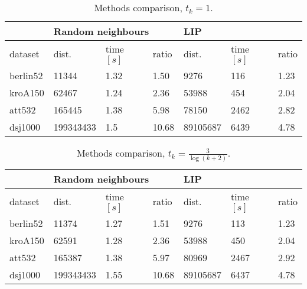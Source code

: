 \begin{table}[!htb]
	\centering
	\begin{tabular}{l|lll|lll|}
		\cline{2-7}
		& \multicolumn{3}{l|}{Random neighbours}                                        & \multicolumn{3}{l|}{LIP}                                          \\ \hline
		\multicolumn{1}{|l|}{dataset}  & \multicolumn{1}{l|}{dist.}     & \multicolumn{1}{l|}{time $[s]$} & ratio & \multicolumn{1}{l|}{dist.}    & \multicolumn{1}{l|}{time $[s]$} & ratio \\ \hline
		\multicolumn{1}{|l|}{berlin52} & \multicolumn{1}{l|}{11344}     & \multicolumn{1}{l|}{1.32} & 1.50  & \multicolumn{1}{l|}{9276}     & \multicolumn{1}{l|}{116}  & 1.23  \\ \hline
		\multicolumn{1}{|l|}{kroA150}  & \multicolumn{1}{l|}{62467}     & \multicolumn{1}{l|}{1.24} & 2.36  & \multicolumn{1}{l|}{53988}    & \multicolumn{1}{l|}{454}  & 2.04  \\ \hline
		\multicolumn{1}{|l|}{att532}   & \multicolumn{1}{l|}{165445}    & \multicolumn{1}{l|}{1.38} & 5.98  & \multicolumn{1}{l|}{78150}    & \multicolumn{1}{l|}{2462} & 2.82  \\ \hline
		\multicolumn{1}{|l|}{dsj1000}  & \multicolumn{1}{l|}{199343433} & \multicolumn{1}{l|}{1.5}  & 10.68 & \multicolumn{1}{l|}{89105687} & \multicolumn{1}{l|}{6439} & 4.78  \\ \hline
	\end{tabular}
	\caption{Methods comparison, $t_k=1$.}
	\label{tab:results_comp_cool=1}
\end{table}

\begin{table}[!htb]
	\centering
	\begin{tabular}{l|lll|lll|}
		\cline{2-7}
		& \multicolumn{3}{l|}{Random neighbours}                                        & \multicolumn{3}{l|}{LIP}                                          \\ \hline
		\multicolumn{1}{|l|}{dataset}  & \multicolumn{1}{l|}{dist.}     & \multicolumn{1}{l|}{time $[s]$} & ratio & \multicolumn{1}{l|}{dist.}    & \multicolumn{1}{l|}{time $[s]$} & ratio \\ \hline
		\multicolumn{1}{|l|}{berlin52} & \multicolumn{1}{l|}{11374}     & \multicolumn{1}{l|}{1.27} & 1.51  & \multicolumn{1}{l|}{9276}     & \multicolumn{1}{l|}{113}  & 1.23  \\ \hline
		\multicolumn{1}{|l|}{kroA150}  & \multicolumn{1}{l|}{62591}     & \multicolumn{1}{l|}{1.28} & 2.36  & \multicolumn{1}{l|}{53988}    & \multicolumn{1}{l|}{450}  & 2.04  \\ \hline
		\multicolumn{1}{|l|}{att532}   & \multicolumn{1}{l|}{165387}    & \multicolumn{1}{l|}{1.38} & 5.97  & \multicolumn{1}{l|}{80969}    & \multicolumn{1}{l|}{2467} & 2.92  \\ \hline
		\multicolumn{1}{|l|}{dsj1000}  & \multicolumn{1}{l|}{199343433} & \multicolumn{1}{l|}{1.55} & 10.68 & \multicolumn{1}{l|}{89105687} & \multicolumn{1}{l|}{6437} & 4.78  \\ \hline
	\end{tabular}
	\caption{Methods comparison, $t_k=\frac{3}{\log(k+2)}$.}
	\label{tab:results_comp_cool=2.73}
\end{table}
